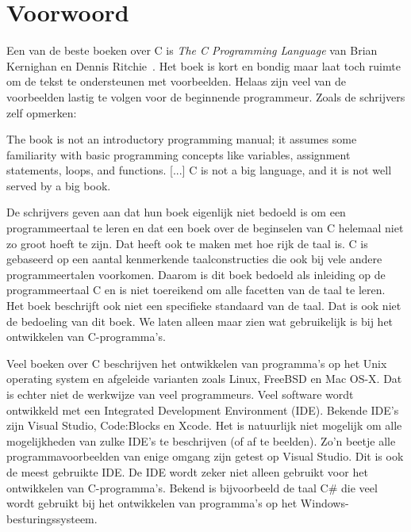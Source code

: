 

\chapter{Voorwoord}
\label{cha:voorwoord}
\thispagestyle{empty}

Een van de beste boeken over C is \textsl{The C Programming Language} van
Brian Kernighan en Dennis Ritchie~\cite{kernighan1988c}. Het boek is kort en
bondig maar laat toch ruimte om de tekst te ondersteunen met voorbeelden.
Helaas zijn veel van de voorbeelden lastig te volgen voor de beginnende
programmeur. Zoals de schrijvers zelf opmerken:

\begin{displayquote}
The book is not an introductory programming manual; it assumes some familiarity
with basic programming concepts like variables, assignment statements,
loops, and functions.
[...]
C is not a big language, and it is not well served by a big book.
\end{displayquote}

De schrijvers geven aan dat hun boek eigenlijk niet bedoeld is om een
programmeertaal te leren
en dat een boek over de beginselen van C helemaal niet zo groot hoeft te zijn.
Dat heeft ook te maken met hoe rijk de taal is. C is gebaseerd op een aantal
kenmerkende taalconstructies die ook bij vele andere programmeertalen voorkomen.
Daarom is dit boek bedoeld als inleiding op de programmeertaal C en is niet
toereikend om alle facetten van de taal te leren. Het boek beschrijft ook niet
een specifieke standaard van de taal. Dat is ook niet de
bedoeling van dit boek. We laten alleen maar zien wat gebruikelijk is bij
het ontwikkelen van C-programma's. 

Veel boeken over C beschrijven het ontwikkelen van programma's op het Unix
operating system en afgeleide varianten zoals Linux, FreeBSD en Mac OS-X.
Dat is echter niet de werkwijze van veel programmeurs. Veel software wordt
ontwikkeld met een Integrated Development Environment (IDE). Bekende IDE's
zijn Visual Studio, Code:Blocks en Xcode. Het is natuurlijk niet mogelijk
om alle mogelijkheden van zulke IDE's te beschrijven (of af te beelden).
Zo'n beetje alle programmavoorbeelden van enige omgang zijn getest op
Visual Studio. Dit is ook de meest gebruikte IDE. De IDE wordt zeker niet
alleen gebruikt voor het ontwikkelen van C-programma's. Bekend is bijvoorbeeld
de taal C\# die veel wordt gebruikt bij het ontwikkelen van programma's op
het Windows-besturingssysteem.

